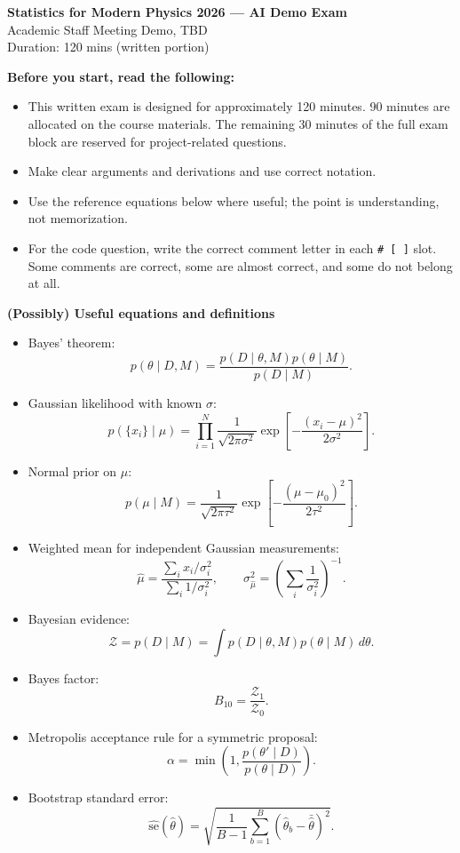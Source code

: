 \documentclass{article}
\newcommand{\examtitle}{Statistics for Modern Physics 2026 --- AI Demo Exam}
\newcommand{\examdate}{Academic Staff Meeting Demo}
\newcommand{\examlocation}{TBD}
\newcommand{\examduration}{120 mins (written portion)}
\begin{document}
\begin{center}
\textbf{\Huge{\examtitle}}
\\\Large{\examdate, \examlocation}\\
\Large{Duration: \examduration}
\end{center}

\textbf{Before you start, read the following:}
\begin{itemize}
    \item This written exam is designed for approximately 120 minutes. 90 minutes are allocated on the course materials. The remaining 30 minutes of the full exam block are reserved for project-related questions.
    \item Make clear arguments and derivations and use correct notation.
    \item Use the reference equations below where useful; the point is understanding, not memorization.
    \item For the code question, write the correct comment letter in each \verb|# [ ]| slot. Some comments are correct, some are almost correct, and some do not belong at all.
\end{itemize}

\textbf{(Possibly) Useful equations and definitions}

\begin{itemize}[leftmargin=2em]
\item Bayes' theorem:
\[
p(\theta\mid D,M)=\frac{p(D\mid\theta,M)p(\theta\mid M)}{p(D\mid M)}.
\]
\item Gaussian likelihood with known $\sigma$:
\[
p(\{x_i\}\mid \mu)=\prod_{i=1}^N\frac{1}{\sqrt{2\pi\sigma^2}}\exp\!\left[-\frac{(x_i-\mu)^2}{2\sigma^2}\right].
\]
\item Normal prior on $\mu$:
\[
p(\mu\mid M)=\frac{1}{\sqrt{2\pi\tau^2}}\exp\!\left[-\frac{(\mu-\mu_0)^2}{2\tau^2}\right].
\]
\item Weighted mean for independent Gaussian measurements:
\[
\hat\mu = \frac{\sum_i x_i/\sigma_i^2}{\sum_i 1/\sigma_i^2},
\qquad
\sigma_{\hat\mu}^2 = \left(\sum_i \frac{1}{\sigma_i^2}\right)^{-1}.
\]
\item Bayesian evidence:
\[
\mathcal Z=p(D\mid M)=\int p(D\mid\theta,M)p(\theta\mid M)\,d\theta.
\]
\item Bayes factor:
\[
B_{10}=\frac{\mathcal Z_1}{\mathcal Z_0}.
\]
\item Metropolis acceptance rule for a symmetric proposal:
\[
\alpha=\min\!\left(1,\frac{p(\theta'\mid D)}{p(\theta\mid D)}\right).
\]
\item Bootstrap standard error:
\[
\widehat{\mathrm{se}}(\hat\theta)=\sqrt{\frac{1}{B-1}\sum_{b=1}^{B}(\hat\theta_b-\bar{\hat\theta})^2}.
\]
\end{itemize}
\end{document}
